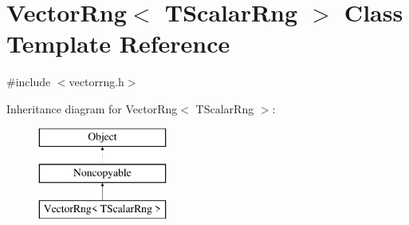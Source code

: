 \hypertarget{classVectorRng}{}\section{Vector\+Rng$<$ T\+Scalar\+Rng $>$ Class Template Reference}
\label{classVectorRng}


{\ttfamily \#include $<$vectorrng.\+h$>$}

Inheritance diagram for Vector\+Rng$<$ T\+Scalar\+Rng $>$\+:\begin{figure}[H]
\begin{center}
\leavevmode
\includegraphics[height=3.000000cm]{classVectorRng}
\end{center}
\end{figure}
